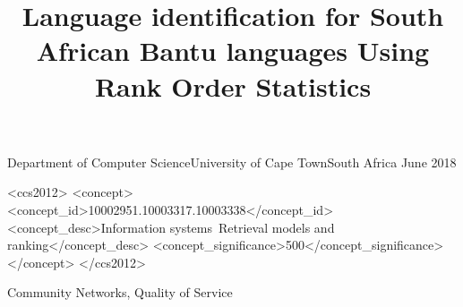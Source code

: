 \documentclass[plain]{sigplanconf}
\begin{document}
	\title{Language identification for South African Bantu languages Using Rank Order Statistics}
	{Department of Computer Science\linebreak University of Cape Town\linebreak South Africa}
	{June 2018}
	\maketitle
	\begin{abstract}
	\end{abstract}
	\begin{CCSXML}
		<ccs2012>
		<concept>
		<concept_id>10002951.10003317.10003338</concept_id>		
		<concept_desc>Information systems~Retrieval models and ranking</concept_desc>
		<concept_significance>500</concept_significance>
		</concept>
		</ccs2012>
	\end{CCSXML}
	\keywords
	Community Networks, Quality of Service
	
	
	
	
	
	
	
	
	
\end{document}
